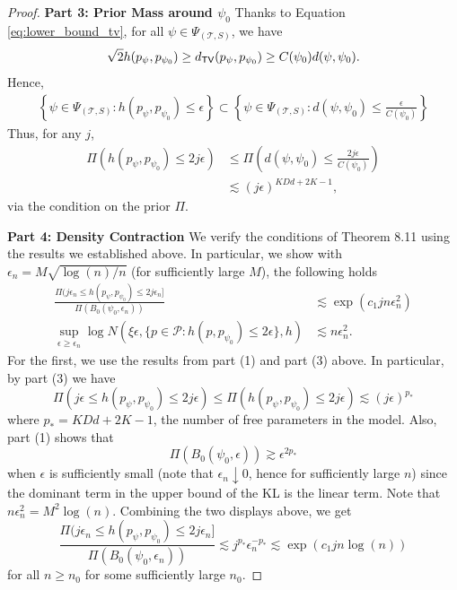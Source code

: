 \documentclass[bj,authoryear]{imsart}
\theoremstyle{plain}
\theoremstyle{remark}
\def\cP{\mathcal{P}}
\def\cT{\mathcal{T}}
\def\TV{{\sf TV}}
\begin{document}
\begin{appendix}
\begin{proof}
\vspace{1em}
\textbf{Part 3: Prior Mass around $\psi_0$}  Thanks to Equation \eqref{eq:lower_bound_tv}, for all $\psi\in\Psi_{(\cT,S)}$, we have
\begin{align}
    \sqrt{2}h(p_{\psi},p_{\psi_0}) \geq d_{\TV}(p_{\psi},p_{\psi_0}) \geq C(\psi_0)d(\psi,\psi_0).
\end{align}
Hence,
\begin{align}
    \left\{\psi\in\Psi_{(\cT,S)}: h(p_{\psi},p_{\psi_0}) \leq \epsilon\right\} \subset \left\{\psi\in\Psi_{(\cT,S)}: d(\psi,\psi_0) \leq \frac{\epsilon}{C(\psi_0)}\right\}
\end{align}
Thus, for any $j$, 
\begin{align}
    \Pi\left(h(p_{\psi},p_{\psi_0}) \leq 2j\epsilon\right) &\leq \Pi\left(d(\psi,\psi_0) \leq \frac{2j\epsilon}{C(\psi_0)}\right) \\
    &\lesssim (j\epsilon)^{KDd+2K-1},
\end{align}
via the condition on the prior $\Pi$.

\vspace{1em}
\textbf{Part 4: Density Contraction} We verify the conditions of Theorem 8.11 \cite{ghosal2017fundamentals} using the results we established above. In particular, we show with $\epsilon_n=M\sqrt{\log(n) / n}$ (for sufficiently large $M$), the following holds
\begin{align}
    \frac{\Pi(j\epsilon_n\leq h(p_{\psi},p_{\psi_0})\leq 2j\epsilon_n]}{\Pi(B_0(\psi_0,\epsilon_n))} &\lesssim \exp\left(c_1 jn\epsilon_n^2\right) \\
    \sup_{\epsilon\geq \epsilon_n} \log N\left(\xi\epsilon, \{p\in\cP: h(p,p_{\psi_0})\leq 2\epsilon\}, h\right)&\lesssim n\epsilon_n^2.
\end{align}
For the first, we use the results from part (1) and part (3) above. In particular, by part (3) we have
$$\Pi(j\epsilon\leq h(p_{\psi},p_{\psi_0})\leq 2j\epsilon) \leq \Pi(h(p_{\psi},p_{\psi_0})\leq 2j\epsilon) \lesssim (j\epsilon)^{p_*}$$
where $p_*=KDd+2K-1$, the number of free parameters in the model. Also, part (1) shows that
$$\Pi(B_0(\psi_0, \epsilon))\gtrsim \epsilon^{2p_*}$$
when $\epsilon$ is sufficiently small (note that $\epsilon_n\downarrow 0$, hence for sufficiently large $n$) since the dominant term in the upper bound of the KL is the linear term. Note that $n\epsilon_n^2 = M^2 \log (n)$. Combining the two displays above, we get
$$\frac{\Pi(j\epsilon_n\leq h(p_{\psi},p_{\psi_0})\leq 2j\epsilon_n]}{\Pi(B_0(\psi_0,\epsilon_n))} \lesssim j^{p_*}\epsilon_n^{-p_*} \lesssim \exp(c_1 j n \log(n))$$
for all $n\geq n_0$ for some sufficiently large $n_0$.


\end{proof}
\end{appendix}
\end{document}
